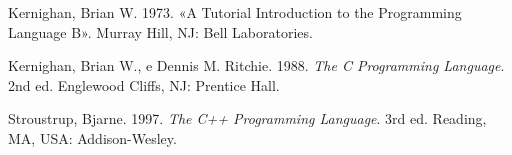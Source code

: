 \documentclass[
  letterpaper,
]{scrbook}
\newlength{\cslhangindent}
\newenvironment{CSLReferences}[2] %
 {\begin{list}{}{%
  \setlength{\itemindent}{0pt}
  \setlength{\leftmargin}{0pt}
  \setlength{\parsep}{0pt}
  \ifodd #1
   \setlength{\leftmargin}{\cslhangindent}
   \setlength{\itemindent}{-1\cslhangindent}
  \fi
  \setlength{\itemsep}{#2\baselineskip}}}
 {\end{list}}
\begin{document}

\label{refs}
\begin{CSLReferences}{1}{0}
Kernighan, Brian W. 1973. {«A Tutorial Introduction to the Programming
Language B»}. Murray Hill, NJ: Bell Laboratories.

Kernighan, Brian W., e Dennis M. Ritchie. 1988. \emph{The C Programming
Language}. 2nd ed. Englewood Cliffs, NJ: Prentice Hall.

Stroustrup, Bjarne. 1997. \emph{The C++ Programming Language}. 3rd ed.
Reading, MA, USA: Addison-Wesley.

\end{CSLReferences}


\backmatter
\end{document}
